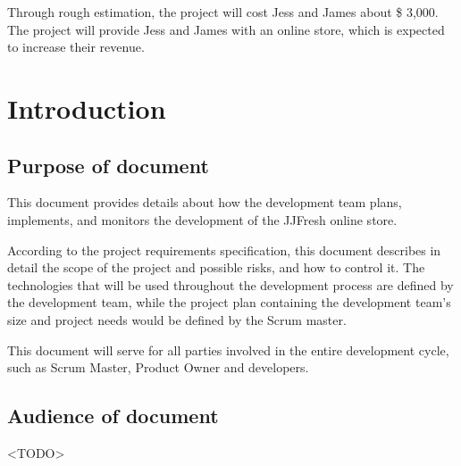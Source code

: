 \documentclass{report}
\begin{document}
   Through rough estimation, the project will cost Jess and James about \$ 3,000. The project will provide Jess and James with an online store, which is expected to increase their revenue. 


\pagebreak
\clearpage

\tableofcontents
\pagebreak
\chapter{Introduction}
\label{chap:intro}
\section{Purpose of document}
   This document provides details about how the development team plans, implements, and monitors the development of the JJFresh online store. 

   According to the project requirements specification, this document describes in detail the scope of the project and possible risks, and how to control it. The technologies that will be used throughout the development process are defined by the development team, while the project plan containing the development team's size and project needs would be defined by the Scrum master.

   This document will serve for all parties involved in the entire development cycle, such as Scrum Master, Product Owner and developers.

\section{Audience of document}
\label{sec:audienceOfDocument}
<TODO>
\end{document}
